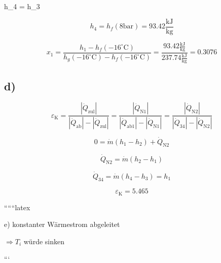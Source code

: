  \quad h_4 = h_3

\[
h_4 = h_f \left( 8 \text{bar} \right) = 93.42 \frac{\text{kJ}}{\text{kg}}
\]


\[
x_1 = \frac{h_1 - h_f \left( -16^\circ \text{C} \right)}{h_g \left( -16^\circ \text{C} \right) - h_f \left( -16^\circ \text{C} \right)} = \frac{93.42 \frac{\text{kJ}}{\text{kg}}}{237.74 \frac{\text{kJ}}{\text{kg}}} = 0.3076
\]

\subsection*{d)}

\[
\varepsilon_{\text{K}} = \frac{\left| \dot{Q}_{\text{zul}} \right|}{\left| \dot{Q}_{\text{ab}} \right| - \left| \dot{Q}_{\text{zul}} \right|} = \frac{\left| \dot{Q}_{\text{N1}} \right|}{\left| \dot{Q}_{\text{ab1}} \right| - \left| \dot{Q}_{\text{N1}} \right|} = \frac{\left| \dot{Q}_{\text{N2}} \right|}{\left| \dot{Q}_{\text{34}} \right| - \left| \dot{Q}_{\text{N2}} \right|}
\]


\[
0 = \dot{m} \left( h_1 - h_2 \right) + \dot{Q}_{\text{N2}}
\]

\[
\dot{Q}_{\text{N2}} = \dot{m} \left( h_2 - h_1 \right)
\]

\[
\dot{Q}_{34} = \dot{m} \left( h_4 - h_3 \right) = h_1
\]

\[
\varepsilon_{\text{K}} = 5.465
\]

``````latex


e) konstanter Wärmestrom abgeleitet

\(\Rightarrow T_i\) würde sinken

```